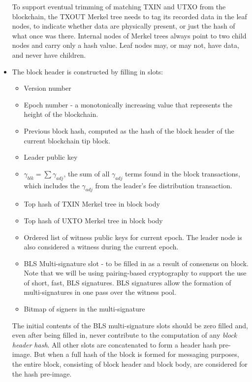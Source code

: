\documentclass[a4paper, 10pt, conference]{ieeeconf}
\begin{document}
\begin{itemize}
{To support eventual trimming of matching TXIN and UTXO from the blockchain, the TXOUT Merkel tree needs to tag its recorded data in the leaf nodes, to indicate whether data are physically present, or just the hash of what once was there. Internal nodes of Merkel trees always point to two child nodes and carry only a hash value. Leaf nodes may, or may not, have data, and never have children.}
\item{The block header is constructed by filling in slots:
\begin{itemize}
\item{Version number}
\item{Epoch number - a monotonically increasing value that represents the height of the blockchain.}
\item{Previous block hash, computed as the hash of the block header of the current blockchain tip block.}
\item{Leader public key}
\item{
$\gamma_{blk} = \sum{\gamma_{adj}}$, the sum of all $\gamma_{adj}$ terms found in the block transactions, which includes the $\gamma_{adj}$ from the leader's fee distribution transaction.}
\item{Top hash of TXIN Merkel tree in block body}
\item{Top hash of UXTO Merkel tree in block body}
\item{Ordered list of witness public keys for current epoch. The leader node is also considered a witness during the current epoch.}
\item{BLS Multi-signature slot - to be filled in as a result of consensus on block. Note that we will be using pairing-based cryptography to support the use of short, fast, BLS signatures. BLS signatures allow the formation of multi-signatures in one pass over the witness pool.}
\item{Bitmap of signers in the multi-signature}
\end{itemize}}

The initial contents of the BLS multi-signature slots should be zero filled and, even after being filled in, never contribute to the computation of any \textit{block header hash}. All other slots are concatenated to form a header hash pre-image. But when a full hash of the block is formed for messaging purposes, the entire block, consisting of block header and block body, are considered for the hash pre-image.


\end{itemize}
\end{document}
